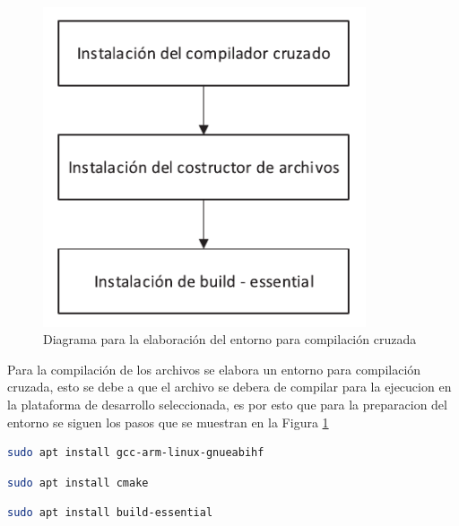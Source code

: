\begin{figure}[h!]
    \centering
    \includegraphics[width=0.85\textwidth]{fig/especifico_2/diagrama_compilador_cruzado.pdf}
    \caption{Diagrama para la elaboración del entorno para compilación cruzada}
    \label{fig:cross_compile_diagram}
\end{figure}

Para la compilación de los archivos se elabora un entorno para compilación cruzada, esto se debe a que el archivo se debera de compilar para la ejecucion en la plataforma de desarrollo seleccionada, es por esto que para la preparacion del entorno se siguen los pasos que se muestran en la Figura \ref{fig:cross_compile_diagram}


\begin{lstlisting}[language=bash, caption={Instalacion del compilador cruzado, Contenedor}, label=lst:cross_compiler]
    sudo apt install gcc-arm-linux-gnueabihf
\end{lstlisting}

\begin{lstlisting}[language=bash, caption={Instalacion de CMake, Contenedor}, label=lst:cmake]
    sudo apt install cmake
\end{lstlisting}

\begin{lstlisting}[language=bash, caption={Instalacion de build essential, Contenedor }, label=lst:build_essential]
    sudo apt install build-essential
\end{lstlisting}

